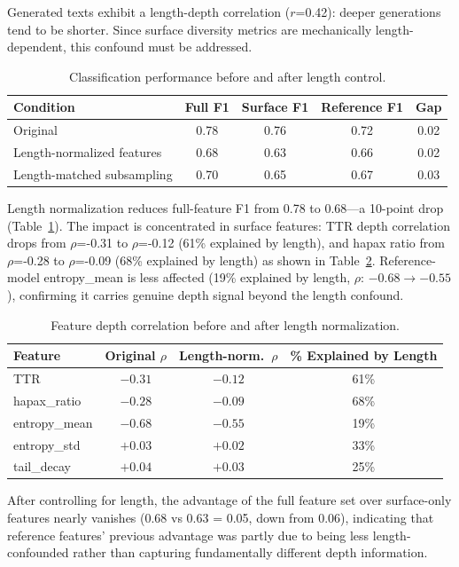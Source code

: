 \documentclass[11pt]{article}
\begin{document}
Generated texts exhibit a length-depth correlation ($r$=0.42): deeper generations tend to be shorter.
Since surface diversity metrics are mechanically length-dependent, this confound must be addressed.

\begin{table}[h]
\centering
\caption{Classification performance before and after length control.}
\label{tab:length}
\begin{tabular}{lcccc}
\toprule
Condition & Full F1 & Surface F1 & Reference F1 & Gap \\
\midrule
Original & 0.78 & 0.76 & 0.72 & 0.02 \\
Length-normalized features & 0.68 & 0.63 & 0.66 & 0.02 \\
Length-matched subsampling & 0.70 & 0.65 & 0.67 & 0.03 \\
\bottomrule
\end{tabular}
\end{table}

Length normalization reduces full-feature F1 from 0.78 to 0.68---a 10-point drop (Table~\ref{tab:length}).
The impact is concentrated in surface features: TTR depth correlation drops from $\rho$=-0.31 to $\rho$=-0.12 (61\% explained by length), and hapax ratio from $\rho$=-0.28 to $\rho$=-0.09 (68\% explained by length) as shown in Table~\ref{tab:length_features}.
Reference-model entropy\_mean is less affected (19\% explained by length, $\rho$: $-0.68 \to -0.55$), confirming it carries genuine depth signal beyond the length confound.

\begin{table}[h]
\centering
\caption{Feature depth correlation before and after length normalization.}
\label{tab:length_features}
\begin{tabular}{lccc}
\toprule
Feature & Original $\rho$ & Length-norm.\ $\rho$ & \% Explained by Length \\
\midrule
TTR & $-0.31$ & $-0.12$ & 61\% \\
hapax\_ratio & $-0.28$ & $-0.09$ & 68\% \\
entropy\_mean & $-0.68$ & $-0.55$ & 19\% \\
entropy\_std & $+0.03$ & $+0.02$ & 33\% \\
tail\_decay & $+0.04$ & $+0.03$ & 25\% \\
\bottomrule
\end{tabular}
\end{table}

After controlling for length, the advantage of the full feature set over surface-only features nearly vanishes (0.68 vs 0.63 = 0.05, down from 0.06), indicating that reference features' previous advantage was partly due to being less length-confounded rather than capturing fundamentally different depth information.
\end{document}
